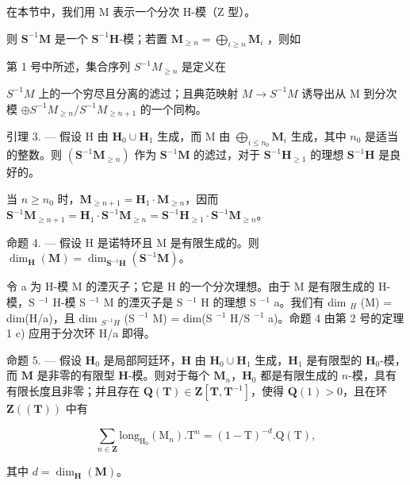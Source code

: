 在本节中，我们用 M 表示一个分次 H-模（Z 型）。

则 \(\mathbf{S}^{-1}\mathbf{M}\) 是一个 \(\mathbf{S}^{-1}\mathbf{H}\)-模；若置 \(\mathbf{M}_{\geqslant n} = \bigoplus_{i\geqslant n}\mathbf{M}_i\) ，则如

第 1 号中所述，集合序列 \(S^{-1}M_{\geqslant n}\) 是定义在

\(S^{-1}M\) 上的一个穷尽且分离的滤过；且典范映射 \(M \to S^{-1}M\) 诱导出从 M 到分次模 \(\oplus S^{-1}M_{\geqslant n}/S^{-1}M_{\geqslant n+1}\) 的一个同构。

引理 3. --- 假设 H 由 \(\mathbf{H}_{0} \cup \mathbf{H}_{1}\) 生成，而 M 由 \(\bigoplus_{i \leqslant n_{0}} \mathbf{M}_{i}\) 生成，其中 \(n_{0}\) 是适当的整数。则 \((\mathbf{S}^{-1}\mathbf{M}_{\geqslant n})\) 作为 \(\mathbf{S}^{-1}\mathbf{M}\) 的滤过，对于 \(\mathbf{S}^{-1}\mathbf{H}_{\geqslant 1}\) 的理想 \(\mathbf{S}^{-1}\mathbf{H}\) 是良好的。

当 \(n \geqslant n_0\) 时，\(\mathbf{M}_{\geqslant n+1} = \mathbf{H}_1 \cdot \mathbf{M}_{\geqslant n}\)，因而 \(\mathbf{S}^{-1} \mathbf{M}_{\geqslant n+1} = \mathbf{H}_1 \cdot \mathbf{S}^{-1} \mathbf{M}_{\geqslant n} = \mathbf{S}^{-1} \mathbf{H}_{\geqslant 1} \cdot \mathbf{S}^{-1} \mathbf{M}_{\geqslant n}\)。

命题 4. --- 假设 H 是诺特环且 M 是有限生成的。则 \(\dim_{\mathbf{H}}(\mathbf{M}) = \dim_{\mathbf{S}^{-1}\mathbf{H}}(\mathbf{S}^{-1}\mathbf{M})\)。

令 a 为 H-模 M 的湮灭子；它是 H 的一个分次理想。由于 M 是有限生成的 H-模，S \(^{-1}\) H-模 S \(^{-1}\) M 的湮灭子是 S \(^{-1}\) H 的理想 S \(^{-1}\) a。我们有 dim \(_{H}\) (M) = dim(H/a)，且 dim \(_{S^{-1}H}\) (S \(^{-1}\) M) = dim(S \(^{-1}\) H/S \(^{-1}\) a)。命题 4 由第 2 号的定理 1 c) 应用于分次环 H/a 即得。

命题 5. --- 假设 \(\mathbf{H}_{0}\) 是局部阿廷环，\(\mathbf{H}\) 由 \(\mathbf{H}_{0} \cup \mathbf{H}_{1}\) 生成，\(\mathbf{H}_{1}\) 是有限型的 \(\mathbf{H}_{0}\)-模，而 \(\mathbf{M}\) 是非零的有限型 \(\mathbf{H}\)-模。则对于每个 \(\mathbf{M}_{n}\)，\(\mathbf{H}_{0}\) 都是有限生成的 \(n\)-模，具有有限长度且非零；并且存在 \(\mathbf{Q}(\mathbf{T}) \in \mathbf{Z}[\mathbf{T}, \mathbf{T}^{-1}]\)，使得 \(\mathbf{Q}(1) > 0\)，且在环 \(\mathbf{Z}((\mathbf{T}))\) 中有

\[
\sum_ {n \in \mathbf {Z}} \mathrm{long} _ {\mathrm{H} _ {0}} (\mathrm{M} _ {n}). \mathrm{T} ^ {n} = (1 - \mathrm{T}) ^ {- d}. \mathrm{Q} (\mathrm{T}),
\]

其中 \(d = \dim_{\mathbf{H}}(\mathbf{M})\)。

